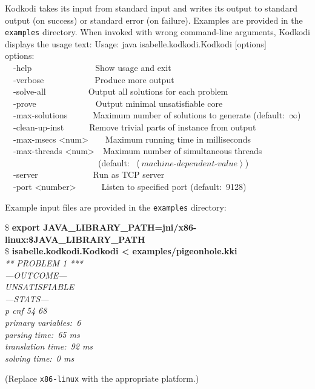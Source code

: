 \documentclass[a4paper,12pt]{article}
\begin{document}
Kodkodi takes its input from standard input and writes its output to standard
output (on success) or standard error (on failure). Examples are provided in the
\texttt{examples} directory. When invoked with wrong command-line arguments,
Kodkodi displays the usage text:
%
\pre
\ttfamily\small
Usage: java isabelle.kodkodi.Kodkodi [options] \\
options: \\
\hbox{}~~-help~~~~~~~~~~~~~~~Show usage and exit \\
\hbox{}~~-verbose~~~~~~~~~~~~Produce more output \\
\hbox{}~~-solve-all~~~~~~~~~~Output all solutions for each problem \\
\hbox{}~~-prove~~~~~~~~~~~~~~Output minimal unsatisfiable core \\
\hbox{}~~-max-solutions~~~~~~Maximum number of solutions to generate (default:~$\infty$) \\
\hbox{}~~-clean-up-inst~~~~~~Remove trivial parts of instance from output \\
\hbox{}~~-max-msecs <num>~~~~Maximum running time in milliseconds \\
\hbox{}~~-max-threads <num>~~Maximum number of simultaneous threads \\ \hbox{}~~~~~~~~~~~~~~~~~~~~~~(default:~$\left<\textit{machine-dependent-value}\right>$) \\
\hbox{}~~-server~~~~~~~~~~~~~Run as TCP server \\
\hbox{}~~-port <number>~~~~~~Listen to specified port (default:~9128)
\post

Example input files are provided in the \texttt{examples} directory:

\pre
\ttfamily\small
\$ \textbf{export JAVA\_LIBRARY\_PATH=jni/x86-linux:\$JAVA\_LIBRARY\_PATH} \\
\$ \textbf{isabelle.kodkodi.Kodkodi < examples/pigeonhole.kki} \\
\slshape *** PROBLEM 1 *** \\[2\smallskipamount]
---OUTCOME--- \\
UNSATISFIABLE \\[2\smallskipamount]
---STATS--- \\
p cnf 54 68 \\
primary variables:~6 \\
parsing time:~65 ms \\
translation time:~92 ms \\
solving time:~0 ms
\post

(Replace \texttt{x86-linux} with the appropriate platform.)
\end{document}
